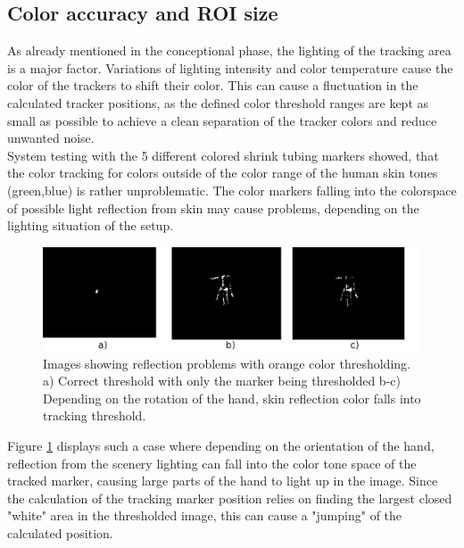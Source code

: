 \subsection{Color accuracy and ROI size}
As already mentioned in the conceptional phase, the lighting of the tracking area is a major factor. Variations of lighting intensity and color temperature cause the color of the trackers to shift their color. This can cause a fluctuation in the calculated tracker positions, as the defined color threshold ranges are kept as small as possible to achieve a clean separation of the tracker colors and reduce unwanted noise. \\
System testing with the 5 different colored shrink tubing markers showed, that the color tracking for colors outside of the color range of the human skin tones (green,blue) is rather unproblematic. The color markers falling into the colorspace of possible light reflection from skin may cause problems, depending on the lighting situation of the setup.
\begin{figure}[H]
\includegraphics[width=\textwidth]{images/color_tracking_probs.png}
\caption{Images showing reflection problems with  orange color thresholding. a) Correct threshold with only the marker being thresholded b-c) Depending on the rotation of the hand, skin reflection color falls into tracking threshold.}
\label{img:Color_reflecton_problems} 
\end{figure}
Figure \ref{img:Color_reflecton_problems} displays such a case where depending on the orientation of the hand, reflection from the scenery lighting can fall into the color tone space of the tracked marker, causing large parts of the hand to light up in the image. Since the calculation of the tracking marker position relies on finding the largest closed "white" area in the thresholded image, this can cause a "jumping" of the calculated position. 
